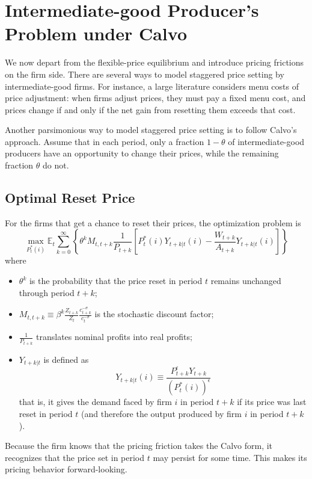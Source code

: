 \documentclass[12pt]{article}
\newcommand{\E}{\mathbb{E}}
\begin{document}
\section{Intermediate-good Producer's Problem under Calvo}

We now depart from the flexible-price equilibrium and introduce pricing frictions on the firm side. There are several ways to model staggered price setting by intermediate-good firms. For instance, a large literature considers menu costs of price adjustment: when firms adjust prices, they must pay a fixed menu cost, and prices change if and only if the net gain from resetting them exceeds that cost. 

Another parsimonious way to model staggered price setting is to follow Calvo's approach. Assume that in each period, only a fraction $1-\theta$ of intermediate-good producers have an opportunity to change their prices, while the remaining fraction $\theta$ do not.

\subsection{Optimal Reset Price}
For the firms that get a chance to reset their prices, the optimization problem is
\begin{equation}
	\max_{P_t^*(i)} \E_t \sum_{k=0}^\infty \left\{ \theta^k  M_{t, t+k} \frac{1}{P_{t+k}}\left[P_t^*(i) Y_{t+k|t}(i) - \frac{W_{t+k}}{A_{t+k}} Y_{t+k|t}(i)\right] \right\}
\end{equation}
where 
\begin{itemize}
		\item $\theta^k$ is the probability that the price reset in period $t$ remains unchanged through period $t+k$;
	\item $M_{t, t+k} \equiv \beta^k \frac{Z_{t+k}}{Z_t} \frac{c_{t+k}^{-\sigma}}{c_t^{-\sigma}}$ is the stochastic discount factor;
	\item $\frac{1}{P_{t+k}}$ translates nominal profits into real profits;
	\item $Y_{t+k|t}$ is defined as 
	\begin{equation}
		Y_{t+k|t}(i) \equiv \frac{P_{t+k}^\epsilon Y_{t+k}}{(P_t^*(i))^{\epsilon}}
	\end{equation}
	that is, it gives the demand faced by firm $i$ in period $t+k$ if its price was last reset in period $t$ (and therefore the output produced by firm $i$ in period $t+k$).
\end{itemize}

Because the firm knows that the pricing friction takes the Calvo form, it recognizes that the price set in period $t$ may persist for some time. This makes its pricing behavior forward-looking.
\end{document}
